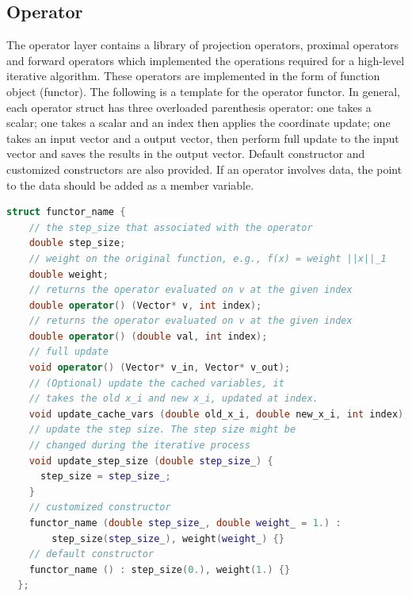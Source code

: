 \subsection{Operator}
The operator layer contains a library of projection operators, proximal operators and forward operators which implemented the operations required for a high-level iterative algorithm. These operators are implemented in the form of function object (functor). The following is a template for the operator functor. In general, each operator struct has three overloaded parenthesis operator: one takes a scalar; one takes a scalar and an index then applies the coordinate update; one takes an input vector and a output vector, then perform full update to the input vector and saves the results in the output vector. Default constructor and customized constructors are also provided. If an operator involves data, the point to the data should be added as a member variable. 

\begin{lstlisting}[language=c++]
  struct functor_name {
    // the step_size that associated with the operator  
    double step_size;
    // weight on the original function, e.g., f(x) = weight ||x||_1
    double weight;      
    // returns the operator evaluated on v at the given index
    double operator() (Vector* v, int index);
    // returns the operator evaluated on v at the given index
    double operator() (double val, int index);
    // full update
    void operator() (Vector* v_in, Vector* v_out);
    // (Optional) update the cached variables, it 
    // takes the old x_i and new x_i, updated at index.
    void update_cache_vars (double old_x_i, double new_x_i, int index);
    // update the step size. The step size might be
    // changed during the iterative process
    void update_step_size (double step_size_) {
      step_size = step_size_;
    }
    // customized constructor
    functor_name (double step_size_, double weight_ = 1.) :
        step_size(step_size_), weight(weight_) {}
    // default constructor
    functor_name () : step_size(0.), weight(1.) {}
  };
\end{lstlisting}

